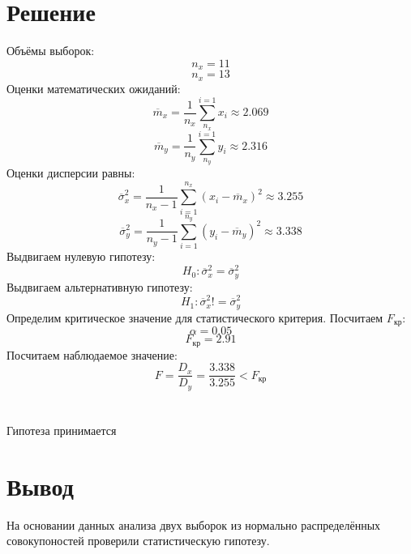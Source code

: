 \documentclass{article}
\begin{document}
\section{Решение}
Объёмы выборок:
\[n_x = 11\]
\[n_x = 13\]
Оценки математических ожиданий:
\[\overline{m}_x = \frac{1}{n_x}\sum_{n_x}^{i=1}x_i \approx 2.069\]
\[\overline{m}_y = \frac{1}{n_y}\sum_{n_y}^{i=1}y_i \approx 2.316\]
Оценки дисперсии равны:
\[\overline{\sigma}_x^2 = \frac{1}{n_x-1}\sum_{i=1}^{n_x}(x_i-\overline{m}_x)^2 \approx 3.255\]
\[\overline{\sigma}_y^2 = \frac{1}{n_y-1}\sum_{i=1}^{n_y}(y_i-\overline{m}_y)^2 \approx 3.338\]
Выдвигаем нулевую гипотезу:
\[H_0: \overline{\sigma}_x^2=\overline{\sigma}_y^2\]
Выдвигаем альтернативную гипотезу:
\[H_1: \overline{\sigma}_x^2!=\overline{\sigma}_y^2\]
Определим критическое значение для статистического критерия. 
Посчитаем $F_{кр}$:
\[\alpha = 0.05\]
\[F_{кр} = 2.91\]
Посчитаем наблюдаемое значение:
\[F = \frac{D_x}{D_y} = \frac{3.338}{3.255} < F_{кр}\]
\\ \\
Гипотеза принимается

\section*{Вывод}
На основании данных анализа двух выборок из нормально распределённых совокупоностей проверили статистическую гипотезу.
\end{document}

